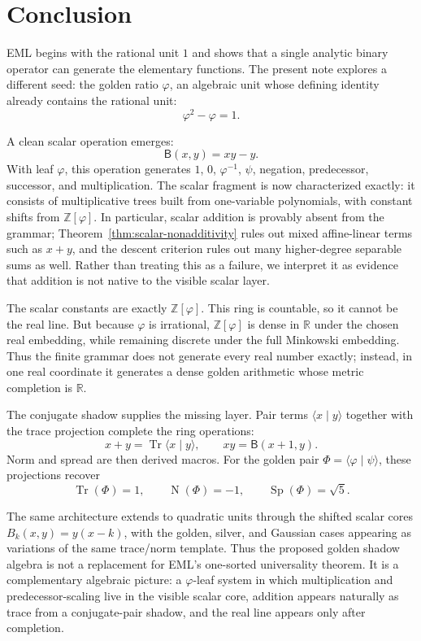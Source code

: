 \documentclass[11pt]{article}
\newcommand{\B}{\mathsf{B}}
\newcommand{\Tr}{\operatorname{Tr}}
\newcommand{\Nm}{\operatorname{N}}
\newcommand{\Sp}{\operatorname{Sp}}
\newcommand{\ph}{\varphi}
\newcommand{\ps}{\psi}
\newcommand{\Z}{\mathbb{Z}}
\newcommand{\R}{\mathbb{R}}
\begin{document}
\section{Conclusion}

EML begins with the rational unit $1$ and shows that a single analytic binary operator can generate the elementary functions.  The present note explores a different seed: the golden ratio $\ph$, an algebraic unit whose defining identity already contains the rational unit:
\[
    \ph^2-\ph=1.
\]

A clean scalar operation emerges:
\[
    \B(x,y)=xy-y.
\]
With leaf $\ph$, this operation generates $1$, $0$, $\ph^{-1}$, $\ps$, negation, predecessor, successor, and multiplication.  The scalar fragment is now characterized exactly: it consists of multiplicative trees built from one-variable polynomials, with constant shifts from $\Z[\ph]$.  In particular, scalar addition is provably absent from the grammar; Theorem~\ref{thm:scalar-nonadditivity} rules out mixed affine-linear terms such as $x+y$, and the descent criterion rules out many higher-degree separable sums as well.  Rather than treating this as a failure, we interpret it as evidence that addition is not native to the visible scalar layer.

The scalar constants are exactly $\Z[\ph]$.  This ring is countable, so it cannot be the real line.  But because $\ph$ is irrational, $\Z[\ph]$ is dense in $\R$ under the chosen real embedding, while remaining discrete under the full Minkowski embedding.  Thus the finite grammar does not generate every real number exactly; instead, in one real coordinate it generates a dense golden arithmetic whose metric completion is $\R$.

The conjugate shadow supplies the missing layer.  Pair terms $\langle x\mid y\rangle$ together with the trace projection complete the ring operations:
\[
    x+y=\Tr\langle x\mid y\rangle,
    \qquad
    xy=\B(x+1,y).
\]
Norm and spread are then derived macros.  For the golden pair $\Phi=\langle\ph\mid\ps\rangle$, these projections recover
\[
    \Tr(\Phi)=1,
    \qquad
    \Nm(\Phi)=-1,
    \qquad
    \Sp(\Phi)=\sqrt5.
\]

The same architecture extends to quadratic units through the shifted scalar cores $B_k(x,y)=y(x-k)$, with the golden, silver, and Gaussian cases appearing as variations of the same trace/norm template.  Thus the proposed golden shadow algebra is not a replacement for EML's one-sorted universality theorem.  It is a complementary algebraic picture: a $\ph$-leaf system in which multiplication and predecessor-scaling live in the visible scalar core, addition appears naturally as trace from a conjugate-pair shadow, and the real line appears only after completion.
\end{document}
